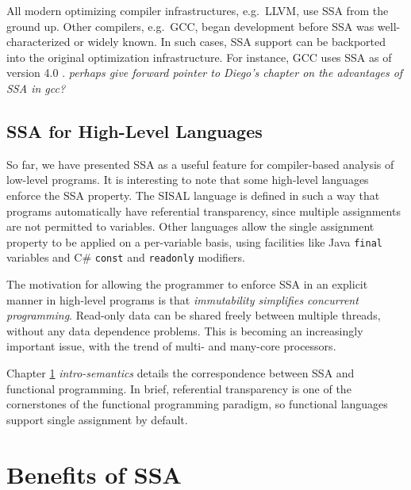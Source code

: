 All modern optimizing compiler infrastructures, e.g.\ LLVM, 
use SSA from the ground up.
Other compilers, e.g.\ GCC, began
development before SSA was well-characterized or
widely known.
In such cases, SSA support can be backported into 
the original optimization infrastructure.
For instance, GCC uses SSA as of version 4.0
\cite{novillo03tree,novillo04design}.
\textit{perhaps give forward pointer to Diego's chapter on the advantages
of SSA in gcc?}

\subsection{SSA for High-Level Languages}

So far, we have presented SSA as a useful feature for 
compiler-based analysis of low-level programs.
It is interesting to note that some high-level languages enforce
the SSA property.
The SISAL language is defined in such a way that
programs automatically have referential transparency, since
multiple assignments are not permitted to variables.
Other languages allow the single assignment property to be
applied on a per-variable basis, using facilities like
Java \texttt{final} variables
and C\# \texttt{const} and \texttt{readonly} modifiers. 

The motivation for allowing the programmer to enforce
SSA in an explicit manner in high-level programs is that
\textit{immutability simplifies concurrent programming}.
Read-only data can be shared freely between multiple threads,
without any data dependence problems.
This is becoming an increasingly important issue, with the
trend of multi- and many-core processors.

Chapter \ref{} \textit{intro-semantics} details the correspondence
between SSA and functional programming.
In brief, referential transparency is one of the
cornerstones of the functional programming paradigm, so 
functional languages support single assignment by default.





\section{Benefits of SSA}

